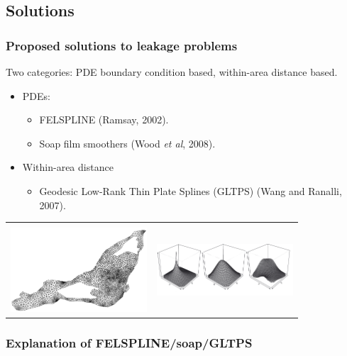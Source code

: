 \documentclass[ignorenonframetext]{beamer} %
\newcommand{\bc}{\begin{center}}
\newcommand{\ec}{\end{center}}
\newcommand{\bi}{\begin{itemize}}
\newcommand{\ei}{\end{itemize}}
\begin{document}

\subsection{Solutions}

\begin{frame}
	\frametitle{Proposed solutions to leakage problems}
	Two categories: PDE boundary condition based, within-area distance based.
       \bi
         \item PDEs:
	  \bi
             \item FELSPLINE (Ramsay, 2002).
             \item Soap film smoothers (Wood \emph{et al}, 2008).
           \ei
           \item Within-area distance
           \bi
             \item Geodesic Low-Rank  Thin Plate Splines (GLTPS) (Wang and Ranalli, 2007).
           \ei
        \ei
        \bc\begin{tabular}{@{}cc}
          & \\
        \includegraphics[width=2in]{figs/ramsaytriangulation.png}&\includegraphics[width=2in]{figs/soapbases.png}\\
        \end{tabular}
        \ec
\end{frame}

\begin{frame}
	\frametitle{Explanation of FELSPLINE/soap/GLTPS}
\end{frame}
\end{document}
